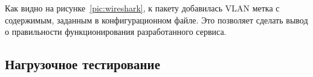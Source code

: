 Как видно на рисунке~\ref{pic:wireshark}, к пакету добавилась VLAN метка с содержимым, заданным в конфигурационном файле. Это позволяет сделать вывод о правильности функционирования разработанного сервиса.

\subsection{Нагрузочное тестирование}
